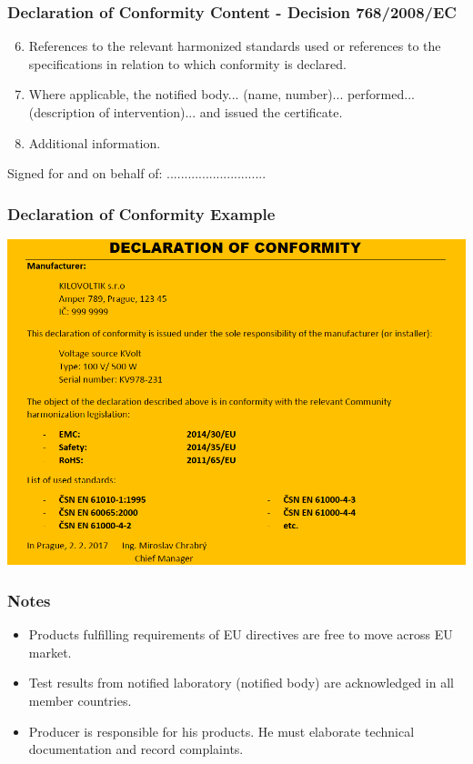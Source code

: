 \documentclass{beamer}
\begin{document}
	\begin{frame}
    \frametitle{Declaration of Conformity Content - Decision 768/2008/EC}
		\small
		\begin{enumerate}
			\setcounter{enumi}{5}
			\item References to the relevant harmonized standards used or references to the specifications in relation to which
conformity is declared.
			\item Where applicable, the notified body... (name, number)... performed... (description of intervention)... and issued the certificate.
			\item Additional information.
		\end{enumerate}
		
		\begin{flushright}
		Signed for and on behalf of: ............................
		\end{flushright}
	\end{frame}
	\begin{frame}
    \frametitle{Declaration of Conformity Example}
		
		\begin{center}
				\includegraphics[scale=0.35]{obr04_prohlaseniES.png}
		\end{center}
	\end{frame}
	\begin{frame}
    \frametitle{Notes}
		
		\begin{itemize}
			\item Products fulfilling requirements of EU directives are free to move across EU market.
			\item Test results from notified laboratory (notified body) are acknowledged in all member countries.
			\item Producer is responsible for his products. He must elaborate technical documentation and record complaints.
		\end{itemize}
	\end{frame}
\end{document}
